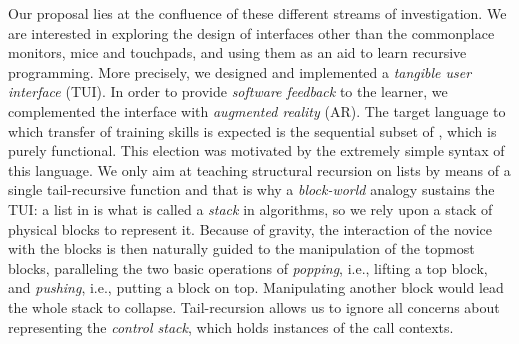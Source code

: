 Our proposal lies at the confluence of these different streams of
investigation. We are interested in exploring the design of interfaces
other than the commonplace monitors, mice and touchpads, and using
them as an aid to learn recursive programming. More precisely, we
designed and implemented a \emph{tangible user interface} (TUI). In
order to provide \emph{software feedback} to the learner, we
complemented the interface with \emph{augmented reality} (AR). The
target language to which transfer of training skills is expected is
the sequential subset of \erlang, which is purely functional. This
election was motivated by the extremely simple syntax of this
language. We only aim at teaching structural recursion on lists by
means of a single tail\hyp{}recursive function and that is why a
\emph{block\hyp{}world} analogy sustains the TUI: a list in \erlang is
what is called a \emph{stack} in algorithms, so we rely upon a stack
of physical blocks to represent it. Because of gravity, the
interaction of the novice with the blocks is then naturally guided to
the manipulation of the topmost blocks, paralleling the two basic
\erlang operations of \emph{popping}, i.e., lifting a top block, and
\emph{pushing}, i.e., putting a block on top. Manipulating another
block would lead the whole stack to collapse. Tail\hyp{}recursion
allows us to ignore all concerns about representing the \emph{control
  stack}, which holds instances of the call contexts.

